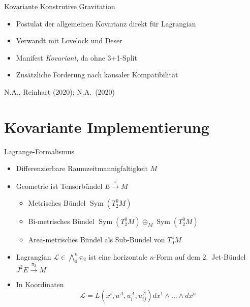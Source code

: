 \documentclass{beamer}
\begin{document}
    \begin{frame}{Kovariante Konstrutive Gravitation}
        \begin{itemize}
            \item Postulat der allgemeinen Kovarianz direkt für Lagrangian
            \item Verwandt mit Lovelock und Deser
            \item Manifest \emph{Kovariant}, da ohne 3+1-Split
            \item Zusätzliche Forderung nach kausaler Kompatibilität
        \end{itemize}

        \raggedleft\scriptsize \lbrack N.A., Reinhart (2020); N.A.\ (2020) \rbrack
    \end{frame}


    \section{Kovariante Implementierung}\label{sec:covariant-constructive-gravity}

    \begin{frame}{Lagrange-Formalismus}
        \begin{itemize}
            \item Differenzierbare Raumzeitmannigfaltigkeit $M$
            \item Geometrie ist Tensorbündel $E \xrightarrow{\pi} M$
            \begin{itemize}
                \item Metrisches Bündel $\operatorname{Sym}(T^0_2 M)$
                \item Bi-metrisches Bündel $\operatorname{Sym}(T^0_2 M) \oplus_M \operatorname{Sym}(T^0_2 M)$
                \item Area-metrisches Bündel als Sub-Bündel von $T^4_0 M$
            \end{itemize}
            \item Lagrangian $\mathscr L \in \bigwedge^n_0 \pi_2$ ist eine horizontale $n$-Form auf dem
            2.\ Jet-Bündel $J^2 E \xrightarrow{\pi_2} M$
            \item In Koordinaten
            \[ \mathscr{L} = L(x^i, u^A, u^A_i, u^A_{ij}) dx^1 \wedge \dots \wedge dx^n \]
        \end{itemize}
    \end{frame}
\end{document}
